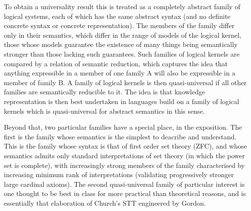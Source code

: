 To obtain a universality result this is treated as a completely abstract family of logical systems, each of which has the same abstract syntax (and no definite concrete syntax or concrete representation).
The members of the family differ only in their semantics,  which differ in the range of models of the logical kernel,
those whose models guarantee the existence of many things being semantically stronger than those lacking such guarantees.
Such families of logical kernels are compared by a relation of semantic reduction, which captures the idea that anything expressible in a member of one family A will also be expressible in a member of family B.
A family of logical kernels is then quasi-universal if all other families are semantically reducible to it.
The idea is that knowledge representation is then best undertaken in languages build on a family of logical kernels which is quasi-universal for abstract semantics in this sense.

Beyond that, two particular families have a special place, in the exposition.
The first is the family whose semantics is the simplest to deacribe and understand.
This is the family whose syntax is that of first order set theory (ZFC), and whose semantics admits only standard interpretations of set theory (in which the power set is complete), with increasingly strong members of the family characterised by increasing minimum rank of interpretations (validating progressively stronger large cardinal axioms).
The second quasi-universal family of particular interest is one thought to be best in class for more practical than theoretical reasons, and is essentially that elaboration of Church's STT engineered by Gordon.
